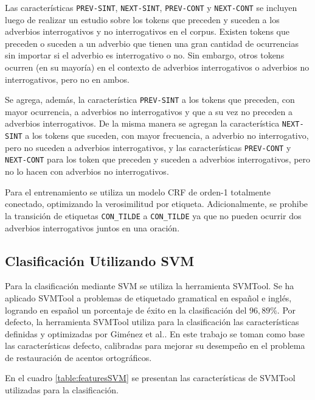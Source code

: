 \documentclass[runningheads,a4paper]{llncs}
\begin{document}
Las características \texttt{\small PREV-SINT}, \texttt{\small NEXT-SINT}, \texttt{\small PREV-CONT} y \texttt{\small NEXT-CONT} se incluyen luego de realizar un estudio sobre los tokens que preceden y  suceden a los adverbios interrogativos y no interrogativos en el corpus. Existen tokens que preceden o suceden a un adverbio que tienen una gran cantidad de ocurrencias sin importar si el adverbio es interrogativo o no. Sin embargo, otros tokens ocurren (en su mayoría) en el contexto de adverbios interrogativos o adverbios no interrogativos, pero no en ambos.

Se agrega, además, la característica \texttt{\small PREV-SINT} a los tokens que preceden, con mayor ocurrencia, a adverbios no interrogativos y que a su vez no preceden a adverbios interrogativos. De la misma manera se agregan la característica \texttt{\small NEXT-SINT} a los tokens que suceden, con mayor frecuencia, a adverbio no interrogativo, pero no suceden a adverbios interrogativos, y  las características \texttt{\small PREV-CONT} y \texttt{\small NEXT-CONT} para los token que preceden y suceden a adverbios interrogativos, pero no lo hacen con adverbios no interrogativos.

Para el entrenamiento se utiliza un modelo CRF de orden-1 totalmente conectado, optimizando la verosimilitud por etiqueta. Adicionalmente, se prohibe la transición de etiquetas \texttt{\small CON\_TILDE} a \texttt{\small CON\_TILDE} ya que no pueden ocurrir dos adverbios interrogativos juntos en una oración. 

\subsection{Clasificación Utilizando SVM}
Para la clasificación mediante SVM se utiliza la herramienta SVMTool. Se ha aplicado SVMTool a problemas de etiquetado gramatical en español e ingl\'es, logrando en español un porcentaje de éxito en la clasificación del $96,89\%$\cite{GIMENEZ04}. Por defecto, la herramienta SVMTool utiliza para la clasificación las características definidas y optimizadas por Giménez et al.\cite{GIMENEZ04}. En este trabajo se toman como base las caracter\'isticas defecto, calibradas para mejorar su desempeño en el problema de restauración de acentos ortográficos.

En el cuadro \ref{table:featuresSVM} se presentan las características de SVMTool utilizadas para la clasificación.
\end{document}
